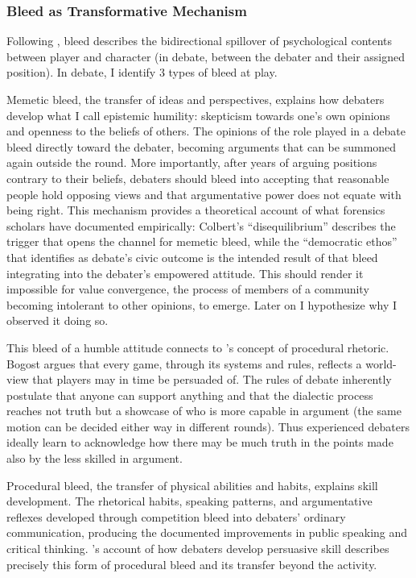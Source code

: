 \subsubsection{Bleed as Transformative Mechanism}

Following \textcite{hugaas2024bleed}, bleed describes the bidirectional spillover of psychological contents between player and character (in debate, between the debater and their assigned position). In debate, I identify 3 types of bleed at play.

Memetic bleed, the transfer of ideas and perspectives, explains how debaters develop what I call epistemic humility: skepticism towards one's own opinions and openness to the beliefs of others. The opinions of the role played in a debate bleed directly toward the debater, becoming arguments that can be summoned again outside the round. More importantly, after years of arguing positions contrary to their beliefs, debaters should bleed into accepting that reasonable people hold opposing views and that argumentative power does not equate with being right. This mechanism provides a theoretical account of what forensics scholars have documented empirically: Colbert's ``disequilibrium'' \parencite{colbert1995enhancing} describes the trigger that opens the channel for memetic bleed, while the ``democratic ethos'' that \textcite{hicks1998public} identifies as debate's civic outcome is the intended result of that bleed integrating into the debater's empowered attitude. This should render it impossible for value convergence, the process of members of a community becoming intolerant to other opinions, to emerge. Later on I hypothesize why I observed it doing so.

This bleed of a humble attitude connects to \textcite{bogost2007persuasive}'s concept of procedural rhetoric. Bogost argues that every game, through its systems and rules, reflects a world-view that players may in time be persuaded of. The rules of debate inherently postulate that anyone can support anything and that the dialectic process reaches not truth but a showcase of who is more capable in argument (the same motion can be decided either way in different rounds). Thus experienced debaters ideally learn to acknowledge how there may be much truth in the points made also by the less skilled in argument.

Procedural bleed, the transfer of physical abilities and habits, explains skill development. The rhetorical habits, speaking patterns, and argumentative reflexes developed through competition bleed into debaters' ordinary communication, producing the documented improvements in public speaking and critical thinking. \textcite{cirlin1997sociological}'s account of how debaters develop persuasive skill describes precisely this form of procedural bleed and its transfer beyond the activity.

